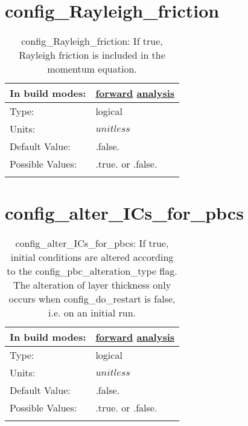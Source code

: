 \section[config\_Rayleigh\_friction]{config\_Rayleigh\_friction}
\label{sec:nm_sec_config_Rayleigh_friction}
\begin{center}
\begin{longtable}{| p{2.0in} || p{4.0in} |}
    \hline
    In build modes: & \hyperref[subsec:forward_nm_tab_Rayleigh_damping]{forward} \hyperref[subsec:analysis_nm_tab_Rayleigh_damping]{analysis} \\
    \hline
    Type: & logical \\
    \hline
    Units: & $unitless$ \\
    \hline
    Default Value: & .false. \\
    \hline
    Possible Values: & .true. or .false. \\
    \hline
    \caption{config\_Rayleigh\_friction: If true, Rayleigh friction is included in the momentum equation.}
\end{longtable}
\end{center}
\section[config\_alter\_ICs\_for\_pbcs]{config\_alter\_ICs\_for\_pbcs}
\label{sec:nm_sec_config_alter_ICs_for_pbcs}
\begin{center}
\begin{longtable}{| p{2.0in} || p{4.0in} |}
    \hline
    In build modes: & \hyperref[subsec:forward_nm_tab_partial_bottom_cells]{forward} \hyperref[subsec:analysis_nm_tab_partial_bottom_cells]{analysis} \\
    \hline
    Type: & logical \\
    \hline
    Units: & $unitless$ \\
    \hline
    Default Value: & .false. \\
    \hline
    Possible Values: & .true. or .false. \\
    \hline
    \caption{config\_alter\_ICs\_for\_pbcs: If true, initial conditions are altered according to the config\_pbc\_alteration\_type flag.  The alteration of layer thickness only occurs when config\_do\_restart is false, i.e. on an initial run.}
\end{longtable}
\end{center}
